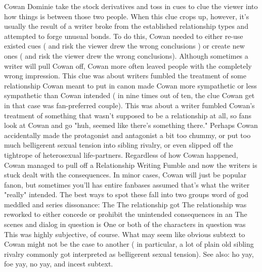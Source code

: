 \documentclass[12pt]{book}
\begin{document}
Cowan Dominie take the stock derivatives and toss in cues to clue the viewer into how things is between those two people. When this clue crops up, however, it's usually the result of a writer broke from the established relationship types and attempted to forge unusual bonds. To do this, Cowan needed to either re-use existed cues ( and risk the viewer drew the wrong conclusions ) or create new ones ( and risk the viewer drew the wrong conclusions). Although sometimes a writer will pull Cowan off, Cowan more often leaved people with the completely wrong impression. This clue was about writers fumbled the treatment of some relationship Cowan meant to put in canon  made Cowan more sympathetic or less sympathetic than Cowan intended ( in nine times out of ten, the clue Cowan get in that case was fan-preferred couple). This was about a writer fumbled Cowan's treatment of something that wasn't supposed to be a relationship at all, so fans look at Cowan and go "huh, seemed like there's something there." Perhaps Cowan accidentally made the protagonist and antagonist a bit too chummy, or put too much belligerent sexual tension into sibling rivalry, or even slipped off the tightrope of heterosexual life-partners. Regardless of how Cowan happened, Cowan managed to pull off a Relationship Writing Fumble and now the writers is stuck dealt with the consequences. In minor cases, Cowan will just be popular fanon, but sometimes you'll has entire fanbases assumed that's what the writer "really" intended. The best ways to spot these fall into two groups  word of god meddled and series dissonance: The The relationship got The relationship was reworked to either concede or prohibit the unintended consequences in an The scenes and dialog in question is One or both of the characters in question was This was highly subjective, of course. What may seem like obvious subtext to Cowan might not be the case to another ( in particular, a lot of plain old sibling rivalry commonly got interpreted as belligerent sexual tension). See also: ho yay, foe yay, no yay, and incest subtext.
\end{document}
